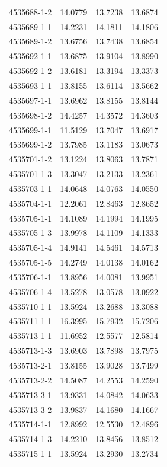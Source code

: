 \begin{longtable}{lrrr}
4535688-1-2 & 14.0779 & 13.7238 & 13.6874 \\
4535689-1-1 & 14.2231 & 14.1811 & 14.1806 \\
4535689-1-2 & 13.6756 & 13.7438 & 13.6854 \\
4535692-1-1 & 13.6875 & 13.9104 & 13.8990 \\
4535692-1-2 & 13.6181 & 13.3194 & 13.3373 \\
4535693-1-1 & 13.8155 & 13.6114 & 13.5662 \\
4535697-1-1 & 13.6962 & 13.8155 & 13.8144 \\
4535698-1-2 & 14.4257 & 14.3572 & 14.3603 \\
4535699-1-1 & 11.5129 & 13.7047 & 13.6917 \\
4535699-1-2 & 13.7985 & 13.1183 & 13.0673 \\
4535701-1-2 & 13.1224 & 13.8063 & 13.7871 \\
4535701-1-3 & 13.3047 & 13.2133 & 13.2361 \\
4535703-1-1 & 14.0648 & 14.0763 & 14.0550 \\
4535704-1-1 & 12.2061 & 12.8463 & 12.8652 \\
4535705-1-1 & 14.1089 & 14.1994 & 14.1995 \\
4535705-1-3 & 13.9978 & 14.1109 & 14.1333 \\
4535705-1-4 & 14.9141 & 14.5461 & 14.5713 \\
4535705-1-5 & 14.2749 & 14.0138 & 14.0162 \\
4535706-1-1 & 13.8956 & 14.0081 & 13.9951 \\
4535706-1-4 & 13.5278 & 13.0578 & 13.0922 \\
4535710-1-1 & 13.5924 & 13.2688 & 13.3088 \\
4535711-1-1 & 16.3995 & 15.7932 & 15.7206 \\
4535713-1-1 & 11.6952 & 12.5577 & 12.5814 \\
4535713-1-3 & 13.6903 & 13.7898 & 13.7975 \\
4535713-2-1 & 13.8155 & 13.9028 & 13.7499 \\
4535713-2-2 & 14.5087 & 14.2553 & 14.2590 \\
4535713-3-1 & 13.9331 & 14.0842 & 14.0633 \\
4535713-3-2 & 13.9837 & 14.1680 & 14.1667 \\
4535714-1-1 & 12.8992 & 12.5530 & 12.4896 \\
4535714-1-3 & 14.2210 & 13.8456 & 13.8512 \\
4535715-1-1 & 13.5924 & 13.2930 & 13.2734 \\

\end{longtable}
